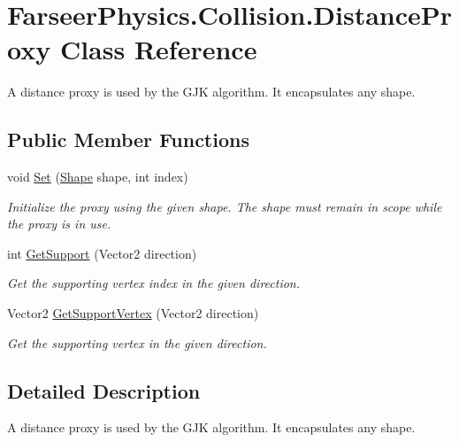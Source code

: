 \hypertarget{class_farseer_physics_1_1_collision_1_1_distance_proxy}{\section{Farseer\+Physics.\+Collision.\+Distance\+Proxy Class Reference}
\label{class_farseer_physics_1_1_collision_1_1_distance_proxy}
}


A distance proxy is used by the G\+J\+K algorithm. It encapsulates any shape.  


\subsection*{Public Member Functions}
\begin{DoxyCompactItemize}
\item 
void \hyperlink{class_farseer_physics_1_1_collision_1_1_distance_proxy_af9fee0568e797fb9c2629d9eae73159e}{Set} (\hyperlink{class_farseer_physics_1_1_collision_1_1_shapes_1_1_shape}{Shape} shape, int index)
\begin{DoxyCompactList}\small\item\em Initialize the proxy using the given shape. The shape must remain in scope while the proxy is in use. \end{DoxyCompactList}\item 
int \hyperlink{class_farseer_physics_1_1_collision_1_1_distance_proxy_aa7958e0a52baa7d6a9d36a62c4995de7}{Get\+Support} (Vector2 direction)
\begin{DoxyCompactList}\small\item\em Get the supporting vertex index in the given direction. \end{DoxyCompactList}\item 
Vector2 \hyperlink{class_farseer_physics_1_1_collision_1_1_distance_proxy_a2066abe18ebd79e94e1195f04537e7c0}{Get\+Support\+Vertex} (Vector2 direction)
\begin{DoxyCompactList}\small\item\em Get the supporting vertex in the given direction. \end{DoxyCompactList}\end{DoxyCompactItemize}


\subsection{Detailed Description}
A distance proxy is used by the G\+J\+K algorithm. It encapsulates any shape. 



